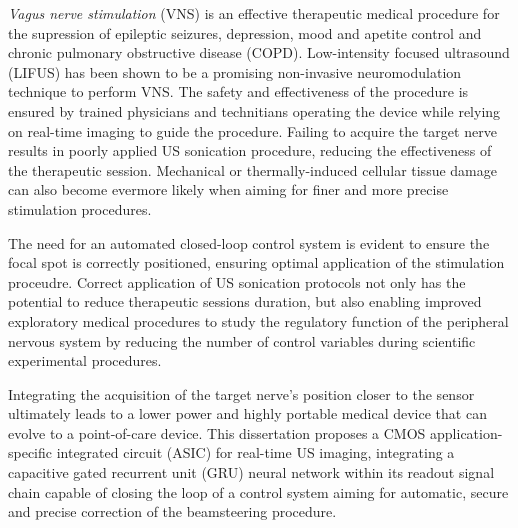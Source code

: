 
%

\textit{Vagus nerve stimulation} (VNS) is an effective therapeutic medical procedure 
for the supression of epileptic seizures, depression, mood and apetite control and 
chronic pulmonary obstructive disease (COPD).
Low-intensity focused ultrasound (LIFUS) has been shown to be a promising 
non-invasive neuromodulation technique to perform VNS.
The safety and effectiveness of the procedure is ensured by
trained physicians and technitians operating the device while relying on real-time 
imaging to guide the procedure. Failing to acquire the target nerve results in 
poorly applied US sonication procedure, reducing the effectiveness of the therapeutic session. 
Mechanical or thermally-induced cellular tissue damage can also become evermore 
likely when aiming for finer and more precise stimulation procedures. 

The need for an automated closed-loop control system is evident to ensure 
the focal spot is correctly positioned, ensuring optimal application of the 
stimulation proceudre. Correct application of US sonication protocols not 
only has the potential to reduce therapeutic sessions duration, but also 
enabling improved exploratory medical procedures to study the regulatory function 
of the peripheral nervous system by reducing the number of control variables 
during scientific experimental procedures.

Integrating the acquisition of the target nerve's position closer to the sensor 
ultimately leads to a lower power and highly portable medical device that can evolve 
to a point-of-care device.
This dissertation proposes a CMOS application-specific integrated circuit (ASIC) for 
real-time US imaging, integrating a capacitive gated recurrent unit (GRU) neural network
within its readout signal chain capable of closing the loop of a control system aiming 
for automatic, secure and precise correction of the beamsteering procedure. 

